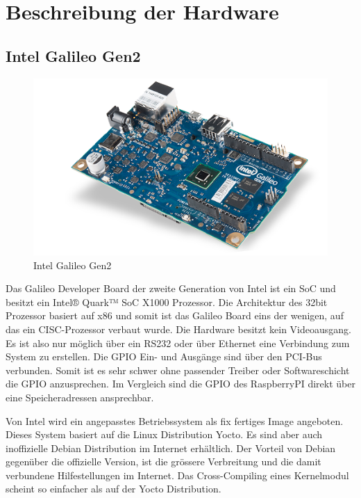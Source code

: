 \section{Beschreibung der Hardware}

\subsection{Intel Galileo Gen2}

\begin{figure}
\centering
\includegraphics[scale=0.5]{images/iot_galileo.png}
\caption{Intel Galileo Gen2\cite{intel_galileo_image}}
\label{fig:Intel Galileo Gen2}
\end{figure}

Das Galileo Developer Board\cite{intel_datasheet_galileo} der zweite Generation von
Intel ist ein SoC und besitzt ein Intel® Quark™ SoC X1000 Prozessor. Die Architektur des 32bit Prozessor basiert auf x86\cite{intel_datasheet} und somit ist das Galileo
Board eins der wenigen, auf das ein CISC-Prozessor verbaut wurde. Die Hardware
besitzt kein Videoausgang. Es ist also nur möglich über ein RS232 oder über Ethernet
eine Verbindung zum System zu erstellen. Die GPIO Ein- und Ausgänge sind über den
PCI-Bus verbunden. Somit ist es sehr schwer ohne passender Treiber oder
Softwareschicht die GPIO anzusprechen. Im Vergleich sind die GPIO des RaspberryPI
direkt über eine Speicheradressen ansprechbar.
\par
Von Intel wird ein angepasstes Betriebssystem als fix fertiges Image angeboten. Dieses System basiert auf
die Linux Distribution Yocto. Es sind aber auch inoffizielle Debian Distribution im
Internet erhältlich. Der Vorteil von Debian gegenüber die offizielle Version, ist die
grössere Verbreitung und die damit verbundene Hilfestellungen im Internet. Das Cross-Compiling eines Kernelmodul scheint so einfacher als auf der Yocto Distribution.


